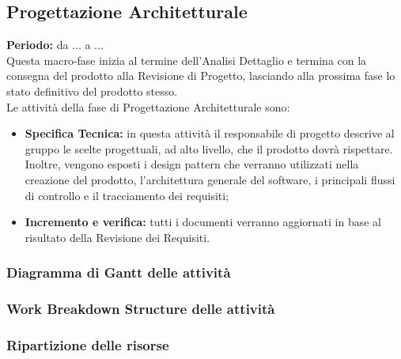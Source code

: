 \subsection{Progettazione Architetturale}
	\textbf{Periodo:} da ... a ... \\
	Questa macro-fase inizia al termine dell'Analisi Dettaglio e termina con la consegna del prodotto alla Revisione di Progetto, lasciando alla prossima fase lo stato definitivo del prodotto stesso. \\
	Le attività della fase di Progettazione Architetturale sono: \\
	\begin{itemize}
		\item \textbf{Specifica Tecnica:} in questa attività il responsabile di progetto descrive al gruppo le scelte progettuali, ad alto livello, che il prodotto dovrà rispettare. Inoltre, vengono esposti i design pattern che verranno utilizzati nella creazione del prodotto, l'architettura generale del software, i principali flussi di controllo e il tracciamento dei requisiti; \\
		\item \textbf{Incremento e verifica:} tutti i documenti verranno aggiornati in base al risultato
della Revisione dei Requisiti.
	\end{itemize}
\subsubsection{Diagramma di Gantt delle attività}
\subsubsection{Work Breakdown Structure delle attività}
\subsubsection{Ripartizione delle risorse}

